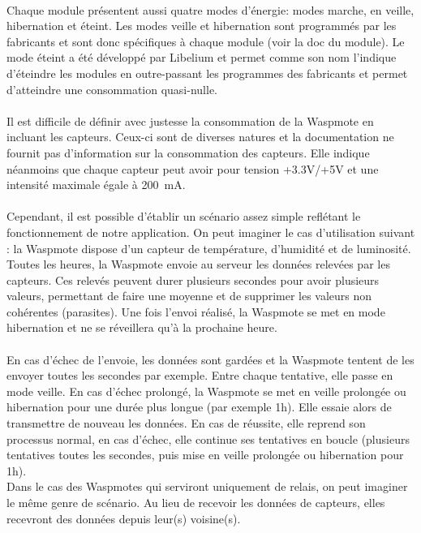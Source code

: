     \paragraph{}Chaque module présentent aussi quatre modes d'énergie: modes marche, en veille, hibernation et éteint. Les modes veille et hibernation sont programmés par les fabricants et sont donc spécifiques à chaque module (voir la doc du module). Le mode éteint a été développé par Libelium et permet comme son nom l'indique d'éteindre les modules en outre-passant les programmes des fabricants et permet d'atteindre une consommation quasi-nulle.
    
    \paragraph{}Il est difficile de définir avec justesse la consommation de la Waspmote en incluant les capteurs. Ceux-ci sont de diverses natures et la documentation ne fournit pas d'information sur la consommation des capteurs. Elle indique néanmoins que chaque capteur peut avoir pour tension +3.3V/+5V et une intensité maximale égale à 200~mA.
    
    \paragraph{}Cependant, il est possible d'établir un scénario assez simple reflétant le fonctionnement de notre application. On peut imaginer le cas d'utilisation suivant : la Waspmote dispose d'un capteur de température, d'humidité et de luminosité. Toutes les heures, la Waspmote envoie au serveur les données relevées par les capteurs. Ces relevés peuvent durer plusieurs secondes pour avoir plusieurs valeurs, permettant de faire une moyenne et de supprimer les valeurs non cohérentes (parasites). Une fois l'envoi réalisé, la Waspmote se met en mode hibernation et ne se réveillera qu'à la prochaine heure.
    
    \paragraph{}En cas d'échec de l'envoie, les données sont gardées et la Waspmote tentent de les envoyer toutes les secondes par exemple. Entre chaque tentative, elle passe en mode veille. En cas d'échec prolongé, la Waspmote se met en veille prolongée ou hibernation pour une durée plus longue (par exemple 1h). Elle essaie alors de transmettre de nouveau les données. En cas de réussite, elle reprend son processus normal, en cas d'échec, elle continue ses tentatives en boucle (plusieurs tentatives toutes les secondes, puis mise en veille prolongée ou hibernation pour 1h).\\
    Dans le cas des Waspmotes qui serviront uniquement de relais, on peut imaginer le même genre de scénario. Au lieu de recevoir les données de capteurs, elles recevront des données depuis leur(s) voisine(s).
    
